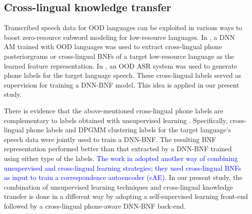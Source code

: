 \documentclass[transmag]{IEEEtran}
\begin{document}
\subsection{Cross-lingual knowledge transfer}
Transcribed speech data for OOD languages \cite{panayotov2015librispeech,aidatatang}
can be exploited in various ways to boost zero-resource subword modeling for low-resource languages. In \cite{shibata2017composite,feng2018exploiting}, a DNN AM trained with  OOD languages was used to extract cross-lingual phone posteriorgrams \cite{shibata2017composite} or cross-lingual BNFs \cite{shibata2017composite,feng2018exploiting} of a target low-resource language as the learned feature representation. 
In \cite{feng2018exploiting,feng2019_TASLP}, an OOD ASR system was used to generate phone labels for the target language speech. These cross-lingual labels served as supervision for training a DNN-BNF model. This idea is applied in our present study.

There is evidence that the above-mentioned cross-lingual phone labels are complementary to labels obtained with unsupervised learning    \cite{feng2018exploiting,feng2019_TASLP}.  Specifically, cross-lingual phone labels and DPGMM clustering labels for the target language’s speech data were jointly used to train a DNN-BNF.
The resulting BNF representation performed better than that extracted by a DNN-BNF trained using either type of the labels. 
\textcolor{blue}{The work in \cite{hermann2021multilingual} adopted another way of combining unsupervised and cross-lingual learning strategies; they used cross-lingual BNFs as input to train a correspondence autoencoder (cAE).}
In our present study, the combination of unsupervised learning techniques and cross-lingual knowledge transfer is done in a different way by adopting a self-supervised learning front-end followed by a cross-lingual phone-aware DNN-BNF back-end. 
\end{document}
